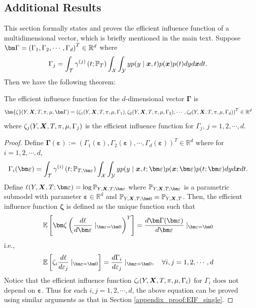 \subsection{Additional Results}
This section formally states and proves the efficient influence function of a multidimensional vector, which is briefly mentioned in the main text.
Suppose $\bm \Gamma=\left(\Gamma_1,\Gamma_2,\cdots,\Gamma_d\right)^T\in\R^d$ where
\[
\Gamma_j=\int_{\mathcal{T}}\gamma^{(j)}\left(t;\mathbb{P}_{T}\right)\int_{\mathcal{X}}\int_{\mathcal{Y}}yp(y\mid\boldsymbol{x},t)p(\boldsymbol{x})p(t)dyd\boldsymbol{x} dt. 
\]
Then we have the following theorem:
\begin{thm}\label{thm:EIF_multidimensional}
The efficient influence function for the $d$-dimensional vector $\bm\Gamma$ 
is
\begin{equation*}
    \bm{\zeta}(Y,\X,T,\pi,\mu,\bm\Gamma)=\left(\zeta_1(Y,\X,T,\pi,\mu,\Gamma_1),\zeta_2(Y,\X,T,\pi,\mu,\Gamma_2),\cdots,\zeta_d(Y,\X,T,\pi,\mu,\Gamma_d)\right)^T\in\R^d
\end{equation*}
where $\zeta_j(Y,\boldsymbol{X},T,\pi,\mu,\Gamma_j)$ is the efficient influence function for $\Gamma_j$, $j=1,2,\cdots,d$.
\end{thm}

\begin{proof}
Define $\bm\Gamma(\bm\varepsilon):=\left(\Gamma_1(\bm\varepsilon),\Gamma_2(\bm\varepsilon),\cdots,\Gamma_d(\bm\varepsilon)\right)^T\in \mathbb{R}^d$
where for $i=1,2,\cdots,d$,
\[
\Gamma_i(\bm\varepsilon)=\int_{\mathcal{T}}\gamma^{(i)}\left(t;\P_{T,\bm\varepsilon}\right)\int_{\mathcal{X}}\int_{\mathcal{Y}}yp(y\mid\x,t;\bm\varepsilon)p(\x;\bm\varepsilon)p(t;\bm\varepsilon)dyd\x dt.
\]
Define
$
\ell(Y,\X,T;\bm\varepsilon)=\log \P_{Y,\X,T;\bm\varepsilon}$
where $\P_{Y,\X,T;\bm\varepsilon}$ is a parametric submodel with parameter $\bm\varepsilon\in\mathbb{R}^d$ and $\P_{Y,\X,T;\bm 0}=\P_{Y,\X,T}$.
Then, the efficient influence function $\bm\zeta$ is defined as the unique function such that
$$
\E \left[\bm\zeta\left(\frac{d \ell}{d\bm\varepsilon}\mid_{\bm\varepsilon=\bm 0}\right)^T\right]=\frac{d\bm\Gamma(\bm\varepsilon)}{d\bm\varepsilon}\mid_{\bm\varepsilon=\bm 0}
$$
i.e.,
$$
\E\left[\zeta_i\frac{d\ell}{d\varepsilon_j}\mid_{\bm\varepsilon=\bm 0}\right]=\frac{d\Gamma_i}{d\varepsilon_j}\mid_{\bm\varepsilon=\bm 0},\quad
\forall i,j=1,2,\cdots,d
$$
Notice that the efficient influence function $\zeta_i(Y,\boldsymbol{X},T,\pi,\mu,\Gamma_i)$ for $\Gamma_i$ does not depend on $\bm\varepsilon$. Thus for each $i,j=1,2,\cdots,d$, the above equation can be proved using similar arguments as that in Section \ref{appendix_proof:EIF_single}.
\end{proof}

